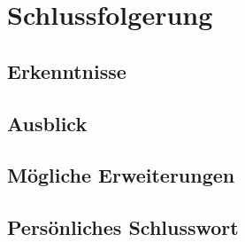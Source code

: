 \chapter{Schlussfolgerung}

\section{Erkenntnisse}

\section{Ausblick}


\section{Mögliche Erweiterungen}


\section{Persönliches Schlusswort}

%
%
%
